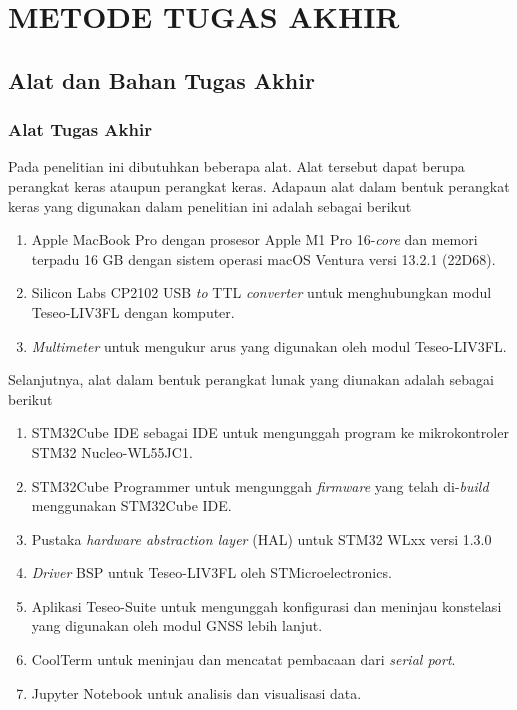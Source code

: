 \chapter{METODE TUGAS AKHIR}

\section{Alat dan Bahan Tugas Akhir}
\subsection{Alat Tugas Akhir}
Pada penelitian ini dibutuhkan beberapa alat. Alat tersebut dapat berupa perangkat keras ataupun perangkat keras. Adapaun alat dalam bentuk perangkat keras yang digunakan dalam penelitian ini adalah sebagai berikut
\begin{enumerate}
	\item Apple MacBook Pro dengan prosesor Apple M1 Pro 16-\textit{core} dan memori terpadu 16 GB dengan sistem operasi macOS Ventura versi 13.2.1 (22D68).
	\item Silicon Labs CP2102 USB \textit{to} TTL \textit{converter} untuk menghubungkan modul Teseo-LIV3FL dengan komputer.
	\item \textit{Multimeter} untuk mengukur arus yang digunakan oleh modul Teseo-LIV3FL.
\end{enumerate}
Selanjutnya, alat dalam bentuk perangkat lunak yang diunakan adalah sebagai berikut
\begin{enumerate}
	\item STM32Cube IDE sebagai IDE untuk mengunggah program ke mikrokontroler STM32 Nucleo-WL55JC1.
	\item STM32Cube Programmer untuk mengunggah \textit{firmware} yang telah di-\textit{build} menggunakan STM32Cube IDE.
	\item Pustaka \textit{hardware abstraction layer} (HAL) untuk STM32 WLxx versi 1.3.0
	\item \textit{Driver} BSP untuk Teseo-LIV3FL oleh STMicroelectronics.
	\item Aplikasi Teseo-Suite untuk mengunggah konfigurasi dan meninjau konstelasi yang digunakan oleh modul GNSS lebih lanjut.
	\item CoolTerm untuk meninjau dan mencatat pembacaan dari \textit{serial port}.
	\item Jupyter Notebook untuk analisis dan visualisasi data.
\end{enumerate}

